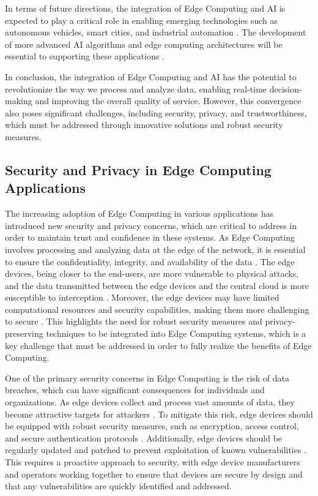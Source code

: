 \documentclass[11pt,a4paper]{article}
\begin{document}
In terms of future directions, the integration of Edge Computing and AI is expected to play a critical role in enabling emerging technologies such as autonomous vehicles, smart cities, and industrial automation \cite{arxiv:2004.07311}. The development of more advanced AI algorithms and edge computing architectures will be essential to supporting these applications \cite{arxiv:2303.14329}. 

In conclusion, the integration of Edge Computing and AI has the potential to revolutionize the way we process and analyze data, enabling real-time decision-making and improving the overall quality of service. However, this convergence also poses significant challenges, including security, privacy, and trustworthiness, which must be addressed through innovative solutions and robust security measures.


\subsection{Security and Privacy in Edge Computing Applications}


The increasing adoption of Edge Computing in various applications has introduced new security and privacy concerns, which are critical to address in order to maintain trust and confidence in these systems. As Edge Computing involves processing and analyzing data at the edge of the network, it is essential to ensure the confidentiality, integrity, and availability of the data \cite{arxiv:1701.01090}. The edge devices, being closer to the end-users, are more vulnerable to physical attacks, and the data transmitted between the edge devices and the central cloud is more susceptible to interception \cite{arxiv:2111.10076}. Moreover, the edge devices may have limited computational resources and security capabilities, making them more challenging to secure \cite{arxiv:1906.08452}. This highlights the need for robust security measures and privacy-preserving techniques to be integrated into Edge Computing systems, which is a key challenge that must be addressed in order to fully realize the benefits of Edge Computing.

One of the primary security concerns in Edge Computing is the risk of data breaches, which can have significant consequences for individuals and organizations. As edge devices collect and process vast amounts of data, they become attractive targets for attackers \cite{arxiv:1702.06331}. To mitigate this risk, edge devices should be equipped with robust security measures, such as encryption, access control, and secure authentication protocols \cite{arxiv:1703.10750}. Additionally, edge devices should be regularly updated and patched to prevent exploitation of known vulnerabilities \cite{arxiv:2211.01863}. This requires a proactive approach to security, with edge device manufacturers and operators working together to ensure that devices are secure by design and that any vulnerabilities are quickly identified and addressed.
\end{document}

